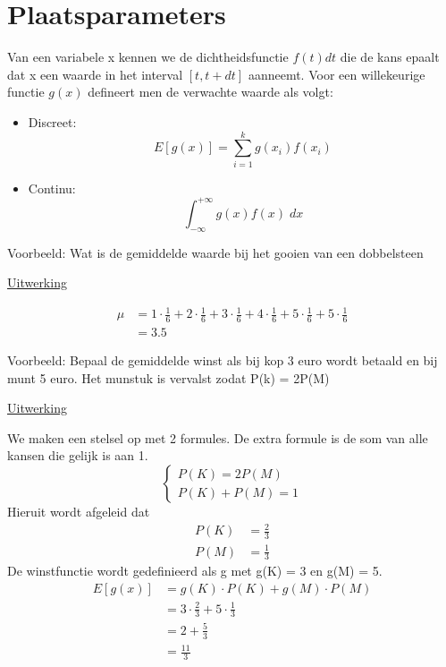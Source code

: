 \documentclass[12pt]{report}
\newcommand{\example}[2]{
      \hrulefill
      
      Voorbeeld: #1
      
      \underline{Uitwerking}
      
      #2
      
      \hrulefill
  }
\begin{document}
\section{Plaatsparameters}
Van een variabele x kennen we de dichtheidsfunctie $f(t)dt$ die de kans epaalt dat x een waarde in het interval $[t, t + dt]$ aanneemt. Voor een willekeurige functie $g(x)$ defineert men de verwachte waarde als volgt:
\begin{itemize}
 \item Discreet: $$E[g(x)] = \sum_{i = 1}^{k} g(x_{i})f(x_i)$$
 \item Continu: $$\int_{-\infty}^{+\infty}g(x)f(x)\; dx$$
\end{itemize}


\example{Wat is de gemiddelde waarde bij het gooien van een dobbelsteen}{
  \begin{equation*}
   \begin{split}
    \mu & = 1\cdot\frac{1}{6} + 2\cdot\frac{1}{6} +3\cdot\frac{1}{6} +4\cdot\frac{1}{6} +5\cdot\frac{1}{6}+ 5\cdot\frac{1}{6}\\
    &= 3.5
   \end{split}
  \end{equation*}
}
\example{Bepaal de gemiddelde winst als bij kop 3 euro wordt betaald en bij munt 5 euro. Het munstuk is vervalst zodat P(k) = 2P(M)}{
We maken een stelsel op met 2 formules. De extra formule is de som van alle kansen die gelijk is aan 1.
$$\begin{cases}
   P(K) = 2P(M) \\
   P(K) + P(M) = 1
  \end{cases}
$$
Hieruit wordt afgeleid dat 
\begin{equation*}
 \begin{split}
   P(K) &= \frac{2}{3} \\
   P(M) &= \frac{1}{3}
 \end{split}
\end{equation*}
De winstfunctie wordt gedefinieerd als g met g(K) = 3 en g(M) = 5.
\begin{equation*}
 \begin{split}
  E[g(x)] & = g(K)\cdot P(K) + g(M)\cdot P(M)\\
          & = 3 \cdot \frac{2}{3} + 5 \cdot \frac{1}{3}\\
          & = 2 + \frac{5}{3}\\
          & = \frac{11}{3}
 \end{split}
\end{equation*}
}
\end{document}
